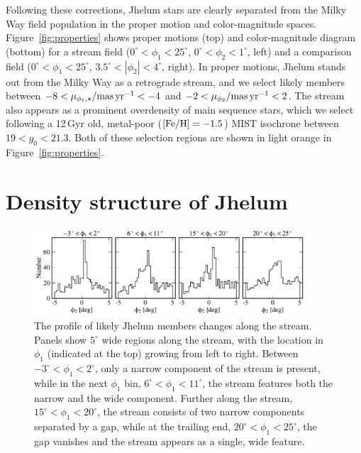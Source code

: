 \documentclass[twocolumn]{aastex62}
\begin{document}
Following these corrections, Jhelum stars are clearly separated from the Milky Way field population in the proper motion and color-magnitude spaces.
Figure~\ref{fig:properties} shows proper motions (top) and color-magnitude diagram (bottom) for a stream field ($0^\circ<\phi_1<25^\circ$, $0^\circ<\phi_2<1^\circ$, left) and a comparison field ($0^\circ<\phi_1<25^\circ$, $3.5^\circ<|\phi_2|<4^\circ$, right).
In proper motions, Jhelum stands out from the Milky Way as a retrograde stream, and we select likely members between $-8<\mu_{\phi_1,\star}/{\rm mas\,yr^{-1}}<-4$ and $-2<\mu_{\phi_2}/{\rm mas\,yr^{-1}}<2$.
The stream also appears as a prominent overdensity of main sequence stars, which we select following a 12\,Gyr old, metal-poor ($\rm[Fe/H]=-1.5$) MIST isochrone \citep{choi2016} between $19<g_0<21.3$.
Both of these selection regions are shown in light orange in Figure~\ref{fig:properties}.


\section{Density structure of Jhelum}
\label{sec:structure}

\begin{figure}
\begin{center}
\includegraphics[width=0.9\textwidth]{phi2_histograms.pdf}
\end{center}
\caption{
The profile of likely Jhelum members changes along the stream.
Panels show $5^\circ$ wide regions along the stream, with the location in $\phi_1$ (indicated at the top) growing from left to right.
Between $-3^\circ<\phi_1<2^\circ$, only a narrow component of the stream is present, while in the next $\phi_1$ bin, $6^\circ<\phi_1<11^\circ$, the stream features both the narrow and the wide component.
Further along the stream, $15^\circ<\phi_1<20^\circ$, the stream consists of two narrow components separated by a gap, while at the trailing end, $20^\circ<\phi_1<25^\circ$, the gap vanishes and the stream appears as a single, wide feature.
}
\label{fig:histo}
\end{figure}
\end{document}
